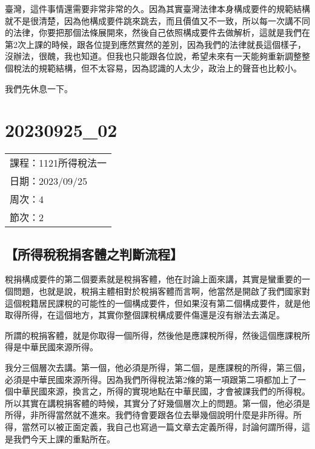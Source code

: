\documentclass[]{ctexbook}
\begin{document}
臺灣，這件事情還需要非常非常的久。因為其實臺灣法律本身構成要件的規範結構就不是很清楚，因為他構成要件跳來跳去，而且價值又不一致，所以每一次講不同的法律，你要把那個法條展開來，然後自己依照構成要件去做解析，這就是我們在第2次上課的時候，跟各位提到應然實然的差別，因為我們的法律就長這個樣子，沒辦法，很醜，我也知道。但我也只能跟各位說，希望未來有一天能夠重新調整整個稅法的規範結構，但不太容易，因為認識的人太少，政治上的聲音也比較小。

我們先休息一下。

\hypertarget{section-8}{%
\chapter{20230925\_02}\label{section-8}}

\begin{longtable}[]{@{}l@{}}
\toprule()
\endhead
課程：1121所得稅法一 \\
日期：2023/09/25 \\
周次：4 \\
節次：2 \\
\bottomrule()
\end{longtable}

\hypertarget{ux6240ux5f97ux7a05ux7a05ux6350ux5ba2ux9ad4ux4e4bux5224ux65b7ux6d41ux7a0b}{%
\section{【所得稅稅捐客體之判斷流程】}\label{ux6240ux5f97ux7a05ux7a05ux6350ux5ba2ux9ad4ux4e4bux5224ux65b7ux6d41ux7a0b}}

稅捐構成要件的第二個要素就是稅捐客體，他在討論上面來講，其實是蠻重要的一個問題，也就是說，稅捐主體相對於稅捐客體而言啊，他當然是開啟了我們國家對這個稅籍居民課稅的可能性的一個構成要件，但如果沒有第二個構成要件，就是他取得所得，在這個地方，其實你整個課稅構成要件傷還是沒有辦法去滿足。

所謂的稅捐客體，就是你取得一個所得，然後他是應課稅所得，然後這個應課稅所得是中華民國來源所得。

我分三個層次去講。第一個，他必須是所得，第二個，是應課稅的所得，第三個，必須是中華民國來源所得。因為我們所得稅法第2條的第一項跟第二項都加上了一個中華民國來源，換言之，所得的實現地點在中華民國，才會被課我們的所得稅。所以其實在講稅捐客體的時候，其實分了好幾個層次上的問題。第一個，他必須是所得，非所得當然就不進來。我們待會要跟各位去舉幾個說明什麼是非所得。所得，當然可以被正面定義，我自己也寫過一篇文章去定義所得，討論何謂所得，這是我們今天上課的重點所在。
\end{document}

